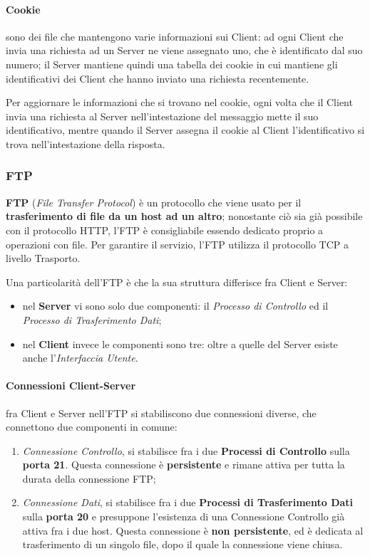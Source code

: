\documentclass[a4paper]{article}
\begin{document}
					
				\paragraph{Cookie}
					sono dei file che mantengono varie informazioni sui Client: ad ogni Client che invia una richiesta ad un Server ne viene assegnato uno, che è identificato dal suo numero; il Server mantiene quindi una tabella dei cookie in cui mantiene gli identificativi dei Client che hanno inviato una richiesta recentemente. 
					
					Per aggiornare le informazioni che si trovano nel cookie, ogni volta che il Client invia una richiesta al Server nell'intestazione del messaggio mette il suo identificativo, mentre quando il Server assegna il cookie al Client l'identificativo si trova nell'intestazione della risposta.
					
				\newpage
		
		\subsubsection{FTP}
		
			\textbf{FTP} (\emph{File Transfer Protocol}) è un protocollo che viene usato per il \textbf{trasferimento di file da un host ad un altro}; nonostante ciò sia già possibile con il protocollo HTTP, l'FTP è consigliabile essendo dedicato proprio a operazioni con file. Per garantire il servizio, l'FTP utilizza il protocollo TCP a livello Trasporto.
			
			Una particolarità dell'FTP è che la sua struttura differisce fra Client e Server:
			\begin{itemize}
				\item nel \textbf{Server} vi sono solo due componenti: il \emph{Processo di Controllo} ed il \emph{Processo di Trasferimento Dati};
				\item nel \textbf{Client} invece le componenti sono tre: oltre a quelle del Server esiste anche l'\emph{Interfaccia Utente}.
			\end{itemize}
			
			
			\paragraph{Connessioni Client-Server}
				fra Client e Server nell'FTP si stabiliscono due connessioni diverse, che connettono due componenti in comune:
				\begin{enumerate}
					\item \emph{Connessione Controllo}, si stabilisce fra i due \textbf{Processi di Controllo} sulla \textbf{porta 21}. Questa connessione è \textbf{persistente} e rimane attiva per tutta la durata della connessione FTP;
					\item \emph{Connessione Dati}, si stabilisce fra i due \textbf{Processi di Trasferimento Dati} sulla \textbf{porta 20} e presuppone l'esistenza di una Connessione Controllo già attiva fra i due host. Questa connessione è \textbf{non persistente}, ed è dedicata al trasferimento di un singolo file, dopo il quale la connessione viene chiusa.
				\end{enumerate}
			
\end{document}
